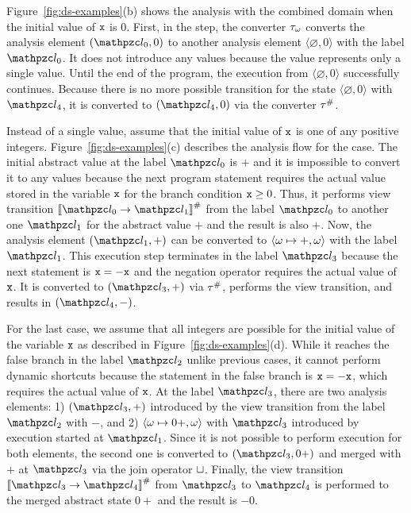 Figure~\ref{fig:ds-examples}(b) shows the analysis with the combined domain when
the initial value of $\texttt{x}$ is $0$.  First, in the  step,
the converter ${\tau}_\omega$ converts the analysis element $(\lab_0, 0)$ to
another analysis element $\langle \varnothing, 0 \rangle$ with the label
$\lab_0$.  It does not introduce any {\sealed} values because
the value represents only a single value.  Until the end of the program, the
{\sealed} execution from $\langle \varnothing, 0 \rangle$ successfully
continues.  Because there is no more possible {\sealed} transition for the
{\sealed} state $\langle \varnothing, 0 \rangle$ with $\lab_4$,
it is converted to $(\lab_4, 0)$ via the converter ${\tau}^{\#}$.

Instead of a single value, assume that the initial value of $\texttt{x}$ is one of
any positive integers.  Figure~\ref{fig:ds-examples}(c) describes the analysis
flow for the case.  The initial abstract value at the label $\lab_0$ is
$+$ and it is impossible to convert it to any {\sealed} values because the
next program statement requires the actual value stored in the variable $\texttt{x}$
for the branch condition $\texttt{x} \geq 0$.  Thus, it performs view transition
$\viewtrans{\lab_0}{\lab_1}$ from the label $\lab_0$ to another one $\lab_1$ for
the abstract value $+$ and the result is also $+$.  Now, the analysis element
$(\lab_1, +)$ can be converted to $\langle \omega \mapsto +, \omega \rangle$
with the label $\lab_1$.  This {\sealed} execution step terminates in the
label $\lab_3$ because the next statement is $\texttt{x} = -\texttt{x}$ and the negation
operator requires the actual value of $\texttt{x}$.  It is converted to $(\lab_3, +)$ via ${\tau}^{\#}$,
performs the view transition, and results in $(\lab_4, -)$.

For the last case, we assume that all integers are possible for the initial
value of the variable $\texttt{x}$ as described in Figure~\ref{fig:ds-examples}(d).
While it reaches the false branch in the label $\lab_2$ unlike previous cases,
it cannot perform dynamic shortcuts because the statement in the false
branch is $\texttt{x} = -\texttt{x}$, which requires the actual value of $\texttt{x}$.
At the label $\lab_3$, there are two analysis
elements: 1) $(\lab_3, +)$ introduced by the view transition from the label $\lab_2$
with $-$, and 2) $\langle \omega \mapsto 0+, \omega \rangle$ with $\lab_3$
introduced by {\sealed} execution started at $\lab_1$.  Since it
is not possible to perform {\sealed} execution for both elements, the
second one is converted to $(\lab_3, 0+)$ and merged with $+$ at $\lab_3$ via the
join operator $\sqcup$.  Finally, the view transition
$\viewtrans{\lab_3}{\lab_4}$ from $\lab_3$ to $\lab_4$ is performed to the
merged abstract state $0+$ and the result is $-0$.

